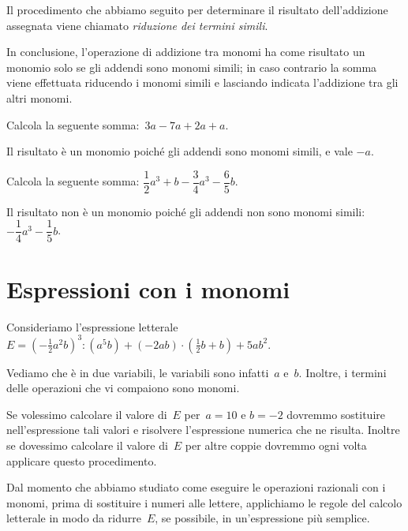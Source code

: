 Il procedimento che abbiamo seguito per determinare il risultato
dell'addizione assegnata viene chiamato
\emph{riduzione dei termini simili}.

In conclusione, l'operazione di addizione tra monomi ha
come risultato un monomio solo se gli addendi sono monomi simili; in
caso contrario la somma viene effettuata riducendo i monomi simili e
lasciando indicata l'addizione tra gli altri monomi.
\pagebreak
\begin{exrig}
 \begin{esempio}
Calcola la seguente somma:~$3a-7a+2a+a$.

Il risultato è un monomio poiché gli addendi sono monomi
simili, e vale $-a$.
 \end{esempio}

 \begin{esempio}
Calcola la seguente somma:
$\dfrac{1}{2}a^{3}+b-\dfrac{3}{4}a^{3}-\dfrac{6}{5}b$.

Il risultato non è un monomio poiché gli addendi non sono
monomi simili: $-{\dfrac{1}{4}}a^{3}-\dfrac{1}{5}b$.
 \end{esempio}
\end{exrig}

\ovalbox{\risolvii \ref{ese:10.24}, \ref{ese:10.25}, \ref{ese:10.26}, \ref{ese:10.27}, \ref{ese:10.28}, \ref{ese:10.29}, \ref{ese:10.30}, \ref{ese:10.31}}

\section{Espressioni con i monomi}
Consideriamo l'espressione letterale
$E=\left(-{\frac{1}{2}}a^{2}b\right)^{3}:(a^{5}b)+(-2ab)\cdot\left(\frac{1}{2}b+b\right)+5ab^{2}$.

Vediamo che è in due variabili, le variabili sono infatti~$a$ e~$b$. Inoltre, i termini delle operazioni che vi compaiono sono monomi.

Se volessimo calcolare il valore di~$E$ per~$a = 10$ e $b = -2$ dovremmo
sostituire nell'espressione tali valori e risolvere
l'espressione numerica che ne risulta. Inoltre se
dovessimo calcolare il valore di~$E$ per altre coppie dovremmo ogni volta
applicare questo procedimento.

Dal momento che abbiamo studiato come eseguire le operazioni razionali
con i monomi, prima di sostituire i numeri alle lettere, applichiamo le
regole del calcolo letterale in modo da ridurre~$E$, se possibile,
in un'espressione più semplice.

